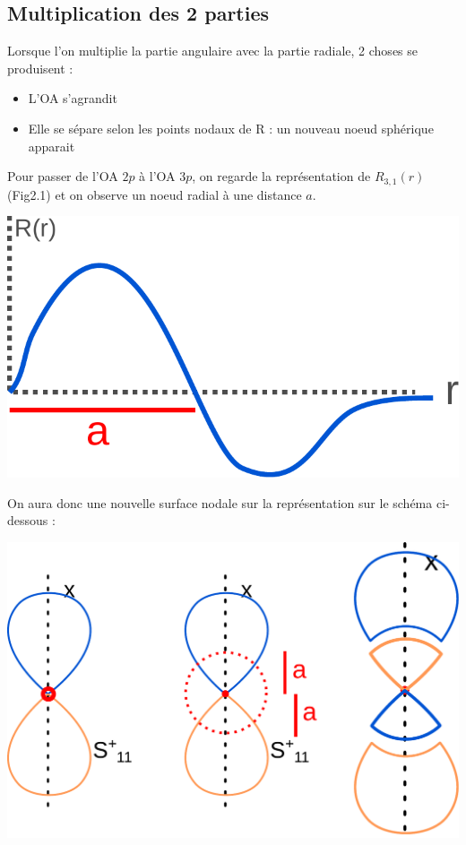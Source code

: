 \documentclass[french]{yLectureNote}
\begin{document}
\subsection{Multiplication des 2 parties}
\begin{multicols}{2}
Lorsque l'on multiplie la partie angulaire avec la partie radiale, 2 choses se produisent :
\begin{itemize}
\item L'OA s'agrandit
\item Elle se sépare selon les points nodaux de R : un nouveau noeud sphérique apparait
\end{itemize}

Pour passer de l'OA $2p$ à l'OA $3p$, on regarde la représentation de $R_{3,1}(r)$ (Fig2.1) et on observe un noeud radial à une distance $a$.

\columnbreak

\includegraphics[scale=0.5]{3p-r}
\end{multicols}
On aura donc une nouvelle surface nodale sur la représentation sur  le schéma ci-dessous :

\includegraphics[scale=0.3]{2p-3p}
\end{document}
